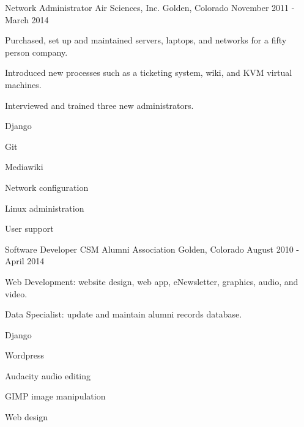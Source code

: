 \begin{cventries}
  \cventry
    {Network Administrator} %
    {Air Sciences, Inc.} %
    {Golden, Colorado} %
    {November 2011 - March 2014} %
    {
      \begin{cvitems} %
        \item {Purchased, set up and maintained servers, laptops, and networks for a fifty person company.}
        \item {Introduced new processes such as a ticketing system, wiki, and KVM virtual machines.}
        \item {Interviewed and trained three new administrators.}
      \end{cvitems}
    }
    \begin{cventryskills}
      \item Django
      \item Git
      \item Mediawiki
      \item Network configuration
      \item Linux administration
      \item User support
    \end{cventryskills}

  \cventry
    {Software Developer} %
    {CSM Alumni Association} %
    {Golden, Colorado} %
    {August 2010 - April 2014} %
    {
      \begin{cvitems} %
        \item {Web Development: website design, web app, eNewsletter, graphics, audio, and video.}
        \item {Data Specialist: update and maintain alumni records database.}
      \end{cvitems}
    }
    \begin{cventryskills}
      \item Django
      \item Wordpress
      \item Audacity audio editing
      \item GIMP image manipulation
      \item Web design
    \end{cventryskills}


\end{cventries}
